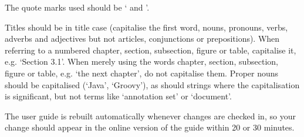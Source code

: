 The quote marks used should be ` and '.

Titles should be in title case (capitalise the first word, nouns, pronouns,
verbs, adverbs and adjectives but not articles, conjunctions or prepositions).
When referring to a numbered chapter, section, subsection, figure or table,
capitalise it, e.g. `Section 3.1'. When merely using the words chapter, section,
subsection, figure or table, e.g. `the next chapter', do not capitalise them.
Proper nouns should be capitalised (`Java', `Groovy'), as should strings where
the capitalisation is significant, but not terms like `annotation set' or
`document'.

The user guide is rebuilt automatically whenever changes are checked in, so
your change should appear in the online version of the guide within 20 or 30
minutes.
